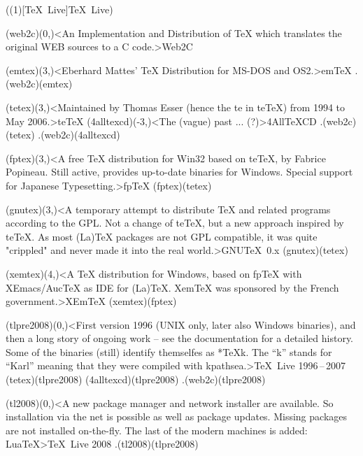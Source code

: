 \tograph(\tostruct(1)[\TeX\ Live]{\TeX\ Live}){
	\tonode(web2c)(0,\layer)<An Implementation and Distribution of TeX which translates the original WEB sources to a C code.>{Web2C}
	\steplayer

	\tonode[\histdistro](emtex)(3,\layer)<Eberhard Mattes' TeX Distribution for MS-DOS and OS2.>{em\TeX} %
	\todraw.(web2c)(emtex)
	\steplayer

	\tonode[\histdistro](tetex)(3,\layer)<Maintained by Thomas Esser (hence the te in teTeX) from 1994 to May 2006.>{te\TeX}
	\tonode[\histdistro](4alltexcd)(-3,\layer)<The (vague) past ... (?)>{4All\TeX CD }
	\todraw.(web2c)(tetex)
	\todraw.(web2c)(4alltexcd)
	\steplayer

	\tonode(fptex)(3,\layer)<A free TeX distribution for Win32 based on teTeX, by Fabrice Popineau. Still active, provides up-to-date binaries for Windows. Special support for Japanese Typesetting.>{fp\TeX}
	\todraw(fptex)(tetex)

	\tonode(gnutex)(3,\layer)<A temporary attempt to distribute TeX and related programs according to the GPL. Not a change of teTeX, but a new approach inspired by teTeX. As most (La)TeX packages are not GPL compatible, it was quite "crippled" and never made it into the real world.>{GNU\TeX\ 0.x}
	\todraw(gnutex)(tetex)

	\steplayer[-2.5]

	\tonode[\histdistro](xemtex)(4,\layer)<A TeX distribution for Windows, based on fpTeX with XEmacs/AucTeX as IDE for (La)TeX. XemTeX was sponsored by the French government.>{XEm\TeX}
	\todraw(xemtex)(fptex)

	\tonode[\histdistro](tlpre2008)(0,\layer)<First version 1996 (UNIX only, later also Windows binaries), and then a long story of ongoing work – see the documentation for a detailed history. Some of the binaries (still) identify themselfes as *TeXk. The “k” stands for “Karl” meaning that they were compiled with kpathsea.>{\TeX\ Live 1996\,–\,2007}
	\todraw(tetex)(tlpre2008)
	\todraw(4alltexcd)(tlpre2008)
	\todraw.(web2c)(tlpre2008)
	\steplayer

	\tonode(tl2008)(0,\layer)<A new package manager and network installer are available. So installation via the net is possible as well as package updates. Missing packages are not installed on-the-fly. The last of the modern machines is added: LuaTeX>{\TeX\ Live 2008}
	\todraw.(tl2008)(tlpre2008)

}
